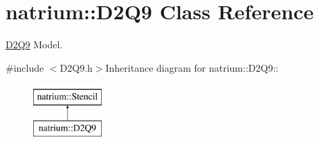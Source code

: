 \hypertarget{classnatrium_1_1D2Q9}{
\section{natrium::D2Q9 Class Reference}
\label{classnatrium_1_1D2Q9}
}


\hyperlink{classnatrium_1_1D2Q9}{D2Q9} Model.  


{\ttfamily \#include $<$D2Q9.h$>$}Inheritance diagram for natrium::D2Q9::\begin{figure}[H]
\begin{center}
\leavevmode
\includegraphics[height=2cm]{classnatrium_1_1D2Q9}
\end{center}
\end{figure}
